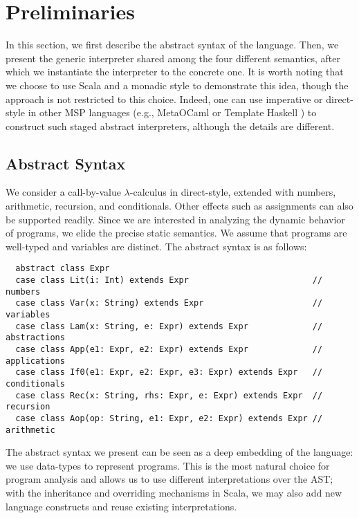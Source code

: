 \newcommand{\TLang}{$L_\lambda$}

\section{Preliminaries} \label{prelim}

In this section, we first describe the abstract syntax of the language. Then,
we present the generic interpreter shared among the four different semantics,
after which we instantiate the interpreter to the concrete one. It is worth
noting that we choose to use Scala and a monadic style to demonstrate this
idea, though the approach is not restricted to this choice.  Indeed, one can
use imperative or direct-style in other MSP languages (e.g., MetaOCaml
\cite{DBLP:conf/gpce/CalcagnoTHL03, DBLP:conf/flops/Kiselyov14} or Template
Haskell \cite{Sheard:2002:TMH:636517.636528}) to construct such staged abstract
interpreters, although the details are different.

\subsection{Abstract Syntax} \label{bg_lang}

We consider a call-by-value $\lambda$-calculus in direct-style, extended with
numbers, arithmetic, recursion, and conditionals. Other effects such as
assignments can also be supported readily. Since we are interested in
analyzing the dynamic behavior of programs, we elide the precise static semantics. We
assume that programs are well-typed and variables are distinct. The
abstract syntax is as follows:
\begin{lstlisting}
  abstract class Expr
  case class Lit(i: Int) extends Expr                         // numbers
  case class Var(x: String) extends Expr                      // variables
  case class Lam(x: String, e: Expr) extends Expr             // abstractions
  case class App(e1: Expr, e2: Expr) extends Expr             // applications
  case class If0(e1: Expr, e2: Expr, e3: Expr) extends Expr   // conditionals
  case class Rec(x: String, rhs: Expr, e: Expr) extends Expr  // recursion
  case class Aop(op: String, e1: Expr, e2: Expr) extends Expr // arithmetic
\end{lstlisting}

The abstract syntax we present can be seen as a deep embedding of the language:
we use data-types to represent programs. This is the most natural choice
for program analysis and allows us to use different interpretations over the
AST; with the inheritance and overriding mechanisms in Scala, we may also add
new language constructs and reuse existing interpretations.

